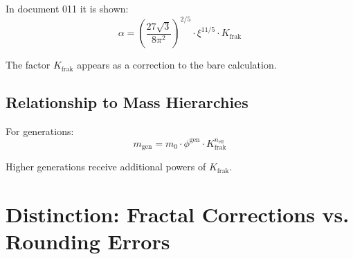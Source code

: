 	In document 011 it is shown:
	\begin{equation}
		\alpha = \left(\frac{27\sqrt{3}}{8\pi^2}\right)^{2/5} \cdot \xi^{11/5} \cdot K_{\text{frak}}
	\end{equation}
	
	The factor $K_{\text{frak}}$ appears as a correction to the bare calculation.
	
	\subsection{Relationship to Mass Hierarchies}
	
	For generations:
	\begin{equation}
		m_{\text{gen}} = m_0 \cdot \phi^{\text{gen}} \cdot K_{\text{frak}}^{n_{\text{eff}}}
	\end{equation}
	
	Higher generations receive additional powers of $K_{\text{frak}}$.
	
	\section{Distinction: Fractal Corrections vs. Rounding Errors}
	
